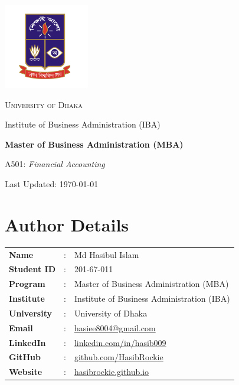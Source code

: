 \documentclass[12pt,a4paper]{book}
\begin{document}
\begin{titlepage}
    \centering
    \vspace*{3.5cm}
    \includegraphics[width=0.28\textwidth]{logo.png}\par\vspace{1.5cm}
    {\scshape\LARGE University of Dhaka\par}
    \vspace{0.5cm}
    {\Large Institute of Business Administration (IBA)\par}
    \vspace{1.5cm}
    {\Huge\bfseries Master of Business Administration (MBA)\par}
    \vspace{1cm}
    {\Large A501: \textit{Financial Accounting}\par}
    \vfill
    {\large Last Updated: \today\par}
\end{titlepage}

\section*{Author Details}
{}

\begin{center}
    \vspace{1em}
    \begin{tabular}{lll}
        \textbf{Name} & : & Md Hasibul Islam \\
        \textbf{Student ID} & : & 201-67-011 \\
        \textbf{Program} & : & Master of Business Administration (MBA) \\
        \textbf{Institute} & : & Institute of Business Administration (IBA) \\
        \textbf{University} & : & University of Dhaka \\
        \textbf{Email} & : & \href{mailto:hasiee8004@gmail.com}{hasiee8004@gmail.com} \\
        \textbf{LinkedIn} & : & \href{https://www.linkedin.com/in/hasib009}{linkedin.com/in/hasib009} \\
        \textbf{GitHub} & : & \href{https://github.com/HasibRockie}{github.com/HasibRockie} \\
        \textbf{Website} & : & \href{https://hasibrockie.github.io}{hasibrockie.github.io} \\
    \end{tabular}
    \vspace{1em}
\end{center}
\end{document}
